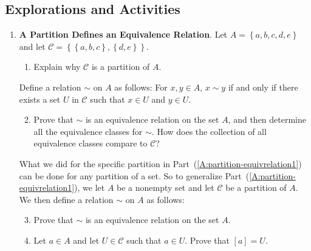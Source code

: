 \subsection*{Explorations and Activities}
\setcounter{oldenumi}{\theenumi}
\begin{enumerate} \setcounter{enumi}{\theoldenumi} 
\item \textbf{A Partition Defines an Equivalence Relation}.  Let  $A = \left\{ {a, b, c, d, e} \right\}$ and let  $\mathcal{C} = \left\{ {\left\{ {a, b, c} \right\}, \left\{ {d, e} \right\}} \right\}$. 
\label{exer:partition-equivrelation}
%

\begin{enumerate}
  \item Explain why $\mathcal{C}$  is a partition of  $A$.
\end{enumerate}

Define a relation  $\sim$  on  $A$  as follows:  For  $x, y \in A$,  $x \sim y$  if and only if  there exists a set  $U$  in $\mathcal{C}$  such that  $x \in U$  and  $y \in U$\!.

\begin{enumerate} \setcounter{enumii}{1}
  \item Prove that  $\sim$  is an equivalence relation on the set  $A$, and then determine all   the equivalence classes for  $\sim$.  How does the collection of all equivalence classes         compare to $\mathcal{C}$? \label{A:partition-equivrelation1}
\end{enumerate}

What we did for the specific partition in Part~(\ref{A:partition-equivrelation1}) can be done for any partition of a set.  So to generalize Part~(\ref{A:partition-equivrelation1}), we let  $A$  be a nonempty set and let $\mathcal{C}$  be a partition of  $A$.  We then define a relation  $\sim$  on  $A$  as follows:  


\begin{enumerate} \setcounter{enumii}{2}
  \item Prove that  $\sim$  is an equivalence relation on the set  $A$.

  \item Let  $a \in A$  and let  $U \in \mathcal{C}$ such that  $a \in U$.  Prove that  
         $[ a ] = U$.
\end{enumerate}


\end{enumerate}
